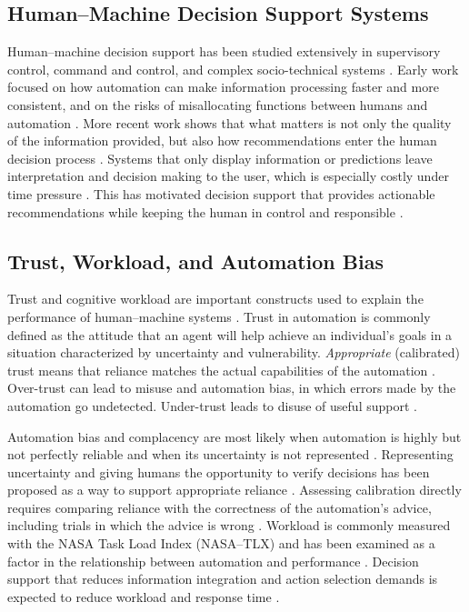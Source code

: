 \documentclass[journal]{IEEEtran}
\theoremstyle{plain}
\theoremstyle{definition}
\begin{document}
\subsection{Human--Machine Decision Support Systems}
Human--machine decision support has been studied extensively in supervisory control, command and control, and complex socio-technical systems \cite{Hodgson2013THMS,Yang2022THMSReview,Bach2024Access}. Early work focused on how automation can make information processing faster and more consistent, and on the risks of misallocating functions between humans and automation \cite{Hodgson2013THMS,Zhang2022THMS}.
More recent work shows that what matters is not only the quality of the information provided, but also how recommendations enter the human decision process \cite{Lai2023FAccT,Muller2022CHIWORK}. Systems that only display information or predictions leave interpretation and decision making to the user, which is especially costly under time pressure \cite{Bach2024Access,PerezCerrolaza2024CSUR}. This has motivated decision support that provides actionable recommendations while keeping the human in control and responsible \cite{Assaad2023TAS,Yang2022THMSReview}.

\subsection{Trust, Workload, and Automation Bias}
Trust and cognitive workload are important constructs used to explain the performance of human--machine systems \cite{Hodgson2013THMS,Bach2024Access}. Trust in automation is commonly defined as the attitude that an agent will help achieve an individual's goals in a situation characterized by uncertainty and vulnerability. \emph{Appropriate} (calibrated) trust means that reliance matches the actual capabilities of the automation \cite{Lee2004}. Over-trust can lead to misuse and automation bias, in which errors made by the automation go undetected. Under-trust leads to disuse of useful support \cite{Lee2004,Parasuraman2010,Raji2019AIES,Raji2022CACM}.

Automation bias and complacency are most likely when automation is highly but not perfectly reliable and when its uncertainty is not represented \cite{Parasuraman2010,Weidinger2022FAccT}. Representing uncertainty and giving humans the opportunity to verify decisions has been proposed as a way to support appropriate reliance \cite{Miller2019XRDS,Bach2024Access}. Assessing calibration directly requires comparing reliance with the correctness of the automation's advice, including trials in which the advice is wrong \cite{Lee2004,Parasuraman2010}. Workload is commonly measured with the NASA Task Load Index (NASA--TLX) \cite{Hart1988} and has been examined as a factor in the relationship between automation and performance \cite{Hodgson2013THMS,Yang2022THMSReview}. Decision support that reduces information integration and action selection demands is expected to reduce workload and response time \cite{Lai2023FAccT,Muller2022CHIWORK}.
\end{document}
